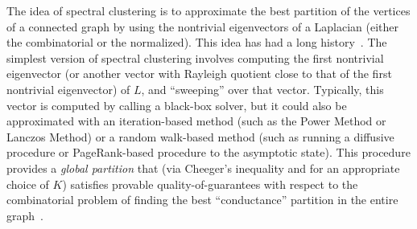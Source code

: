 \documentclass[12pt]{article}
\theoremstyle{plain}
\begin{document}

The idea of spectral clustering is to approximate the 
best partition of the vertices of a connected graph by using the nontrivial 
eigenvectors of a Laplacian (either the combinatorial or the normalized).  
This idea has had a long history~\cite{Donath:1973,fiedler75B,spielman96_spectral,guatterymiller98,ShiMalik00_NCut}.
The simplest version of spectral clustering involves computing the first 
nontrivial eigenvector (or another vector with Rayleigh quotient close to 
that of the first nontrivial eigenvector) of $L$, and ``sweeping'' over 
that vector. 
Typically, this vector is computed by calling a black-box solver, but it 
could also be approximated with an iteration-based method (such as the Power
Method or Lanczos Method) or a random walk-based method (such as running a 
diffusive procedure or PageRank-based procedure to the asymptotic state).
This procedure provides a \emph{global 
partition} that (via Cheeger's inequality and for an appropriate choice of 
$K$) satisfies provable quality-of-guarantees with respect to the 
combinatorial problem of finding the best ``conductance'' partition in the 
entire graph~\cite{Mihail,spielman96_spectral,guatterymiller98}.
\end{document}
